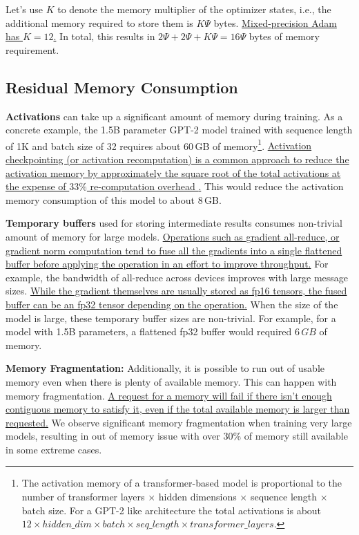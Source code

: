 Let's use $K$ to denote the memory multiplier of the optimizer states, i.e., the additional memory required to store them is $K\Psi$ bytes. \uline{Mixed-precision Adam has $K=12$.} In total, this results in $2\Psi + 2\Psi + K\Psi = 16\Psi$ bytes of memory requirement.

\subsection{Residual Memory Consumption}

\textbf{Activations} can take up a significant amount of memory \cite{DBLP:journals/corr/ChenXZG16} during training.  As a concrete example, the 1.5B parameter GPT-2 model trained with sequence length of 1K and batch size of 32 requires about 60\,GB of memory\footnote{The activation memory of a transformer-based model is proportional to the number of transformer layers $\times$ hidden dimensions $\times$  sequence length $\times$ batch size.  For a GPT-2 like architecture the total activations is about  $12 \times hidden\_dim \times batch \times seq\_length \times transformer\_layers$.}. \uline{Activation checkpointing (or activation recomputation) is a common approach to reduce the activation memory by approximately the square root of the total activations at the expense of $33\%$ re-computation overhead \cite{DBLP:journals/corr/ChenXZG16}.} This would reduce the activation memory consumption of this model to about 8\,GB.

\textbf{Temporary buffers} used for storing intermediate results consumes non-trivial amount of memory for large models. \uline{Operations such as gradient all-reduce, or gradient norm computation tend to fuse all the gradients into a single flattened buffer before applying the operation in an effort to improve throughput.} For example, the bandwidth of all-reduce across devices improves with large message sizes. \uline{While the gradient themselves are usually stored as fp16 tensors, the fused buffer can be an fp32 tensor depending on the operation.} When the size of the model is large, these temporary buffer sizes are non-trivial. For example, for a model with 1.5B parameters, a flattened fp32 buffer would required $6\,GB$ of memory. 

\textbf{Memory Fragmentation: }  Additionally, it is possible to run out of usable memory even when there is plenty of available memory. This can happen with memory fragmentation. \uline{A request for a memory will fail if there isn't enough contiguous memory to satisfy it, even if the total available memory is larger than requested.} We observe significant memory fragmentation when training very large models, resulting in out of memory issue with over 30\% of memory still available in some extreme cases.